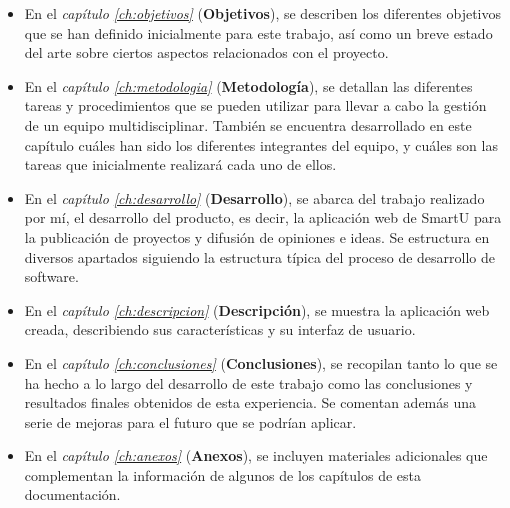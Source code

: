 \begin{itemize}
    \item En el \textit{capítulo \ref{ch:objetivos}} (\textbf{Objetivos}), se describen los diferentes objetivos que se han definido inicialmente para este trabajo, así como un breve estado del arte sobre ciertos aspectos relacionados con el proyecto.
    \item En el \textit{capítulo \ref{ch:metodologia}} (\textbf{Metodología}), se detallan las diferentes tareas y procedimientos que se pueden utilizar para llevar a cabo la gestión de un equipo multidisciplinar. También se encuentra desarrollado en este capítulo cuáles han sido los diferentes integrantes del equipo, y cuáles son las tareas que inicialmente realizará cada uno de ellos.
    \item En el \textit{capítulo \ref{ch:desarrollo}} (\textbf{Desarrollo}), se abarca del trabajo realizado por mí, el desarrollo del producto, es decir, la aplicación web de SmartU para la publicación de proyectos y difusión de opiniones e ideas. Se estructura en diversos apartados siguiendo la estructura típica del proceso de desarrollo de software.
    \item En el \textit{capítulo \ref{ch:descripcion}} (\textbf{Descripción}), se muestra la aplicación web creada, describiendo sus características y su interfaz de usuario.
    \item En el \textit{capítulo \ref{ch:conclusiones}} (\textbf{Conclusiones}), se recopilan tanto lo que se ha hecho a lo largo del desarrollo de este trabajo como las conclusiones y resultados finales obtenidos de esta experiencia. Se comentan además una serie de mejoras para el futuro que se podrían aplicar.
    \item En el \textit{capítulo \ref{ch:anexos}} (\textbf{Anexos}), se incluyen materiales adicionales que complementan la información de algunos de los capítulos de esta documentación.
\end{itemize}
